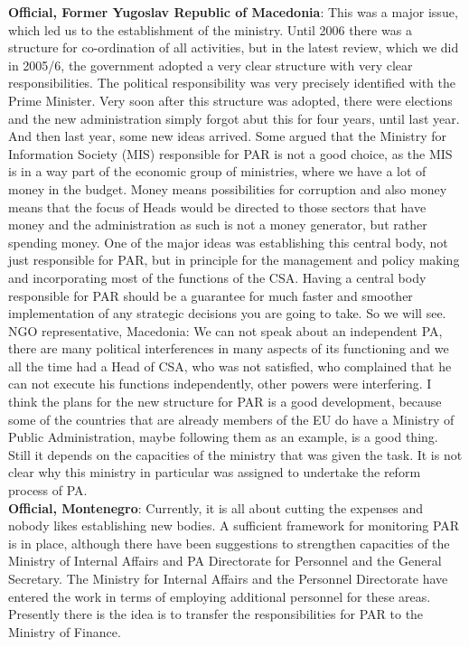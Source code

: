 \textbf{Official, Former Yugoslav Republic of Macedonia}: This was a major issue, which led us to the establishment of the ministry. Until 2006 there was a structure for co-ordination of all activities, but in the latest review, which we did in 2005/6, the government adopted a very clear structure with very clear responsibilities. The political responsibility was very precisely identified with the Prime Minister. Very soon after this structure was adopted, there were elections and the new administration simply forgot abut this for four years, until last year. And then last year, some new ideas arrived. Some argued that the Ministry for Information Society (MIS) responsible for PAR is not a good choice, as the MIS is in a way part of the economic group of ministries, where we have a lot of money in the budget. Money means possibilities for corruption and also money means that the focus of Heads would be directed to those sectors that have money and the administration as such is not a money generator, but rather spending money. One of the major ideas was establishing this central body, not just responsible for PAR, but in principle for the management and policy making and incorporating most of the functions of the CSA. Having a central body responsible for PAR should be a guarantee for much faster and smoother implementation of any strategic decisions you are going to take. So we will see.
NGO representative, Macedonia: We can not speak about an independent PA, there are many political interferences in many aspects of its functioning and we all the time had a Head of CSA, who was not satisfied, who complained that he can not execute his functions independently, other powers were interfering. I think the plans for the new structure for PAR is a good development, because some of the countries that are already members of the EU do have a Ministry of Public Administration, maybe following them as an example, is a good thing. Still it depends on the capacities of the ministry that was given the task. It is not clear why this ministry in particular was assigned to undertake the reform process of PA. \\
\textbf{Official, Montenegro}: Currently, it is all about cutting the expenses and nobody likes establishing new bodies. A sufficient framework for monitoring PAR is in place, although there have been suggestions to strengthen capacities of the Ministry of Internal Affairs and PA Directorate for Personnel and the General Secretary. The Ministry for Internal Affairs and the Personnel Directorate have entered the work in terms of employing additional personnel for these areas. Presently there is the idea is to transfer the responsibilities for PAR to the Ministry of Finance.\\
